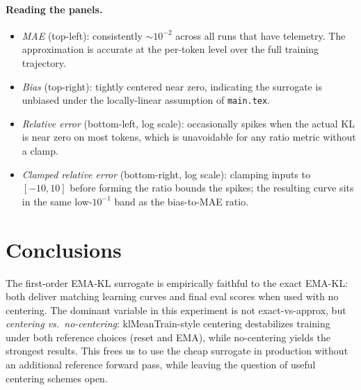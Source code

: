 \documentclass[11pt]{amsart}
\begin{document}
\paragraph{Reading the panels.}
\begin{itemize}[leftmargin=*]
  \item \emph{MAE} (top-left): consistently $\sim\!10^{-2}$ across all runs that have telemetry. The approximation is accurate at the per-token level over the full training trajectory.
  \item \emph{Bias} (top-right): tightly centered near zero, indicating the surrogate is unbiased under the locally-linear assumption of \texttt{main.tex}.
  \item \emph{Relative error} (bottom-left, log scale): occasionally spikes when the actual KL is near zero on most tokens, which is unavoidable for any ratio metric without a clamp.
  \item \emph{Clamped relative error} (bottom-right, log scale): clamping inputs to $[-10,10]$ before forming the ratio bounds the spikes; the resulting curve sits in the same low-$10^{-1}$ band as the bias-to-MAE ratio.
\end{itemize}

\section{Conclusions}

The first-order EMA-KL surrogate is empirically faithful to the exact EMA-KL: both deliver matching learning curves and final eval scores when used with no centering. The dominant variable in this experiment is not exact-vs-approx, but \emph{centering vs.\ no-centering}: klMeanTrain-style centering destabilizes training under both reference choices (reset and EMA), while no-centering yields the strongest results. This frees us to use the cheap surrogate in production without an additional reference forward pass, while leaving the question of useful centering schemes open.
\end{document}
